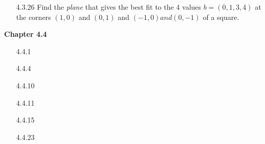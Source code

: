 \documentclass[10pt,twoside,reqno]{article}
\begin{document}
\begin{enumerate}
\vspace{3mm}
\item[4.3.26] Find the \textit{plane} that gives the best fit to the 4 values $b = (0, 1, 3, 4)$ at the corners $(1, 0)$ and $(0, 1)$ and $(-1, 0) and (0, -1)$ of a square.
\vspace{3mm}

\vspace{3mm}

\end{enumerate}
\vspace{5mm}
\textbf{Chapter 4.4}
\begin{enumerate}
\item[4.4.1]
\vspace{3mm}

\vspace{3mm}
\item[4.4.4]
\vspace{3mm}

\vspace{3mm}
\item[4.4.10]
\vspace{3mm}

\vspace{3mm}
\item[4.4.11]
\vspace{3mm}

\vspace{3mm}
\item[4.4.15]
\vspace{3mm}

\vspace{3mm}
\item[4.4.23]
\vspace{3mm}


\end{enumerate}
\end{document}
